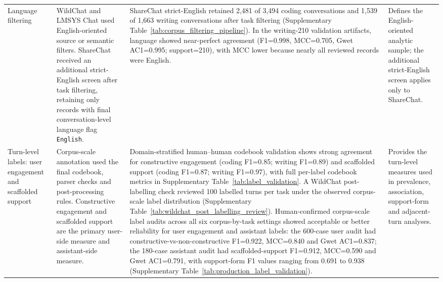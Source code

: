 \begin{table}
\begin{tabularx}{\textheight}{>{\raggedright\arraybackslash}p{0.15\textheight}>{\raggedright\arraybackslash}p{0.24\textheight}>{\raggedright\arraybackslash}p{0.25\textheight}>{\raggedright\arraybackslash}X}
\addlinespace
Language filtering & WildChat and LMSYS Chat used English-oriented source or semantic filters. ShareChat received an additional strict-English screen after task filtering, retaining only records with final conversation-level language flag \texttt{English}. & ShareChat strict-English retained 2,481 of 3,494 coding conversations and 1,539 of 1,663 writing conversations after task filtering (Supplementary Table~\ref{tab:corpus_filtering_pipeline}). In the writing-210 validation artifacts, language showed near-perfect agreement (F1=0.998, MCC=0.705, Gwet AC1=0.995; support=210), with MCC lower because nearly all reviewed records were English. & Defines the English-oriented analytic sample; the additional strict-English screen applies only to ShareChat. \\
\addlinespace
Turn-level labels: user engagement and scaffolded support & Corpus-scale annotation used the final codebook, parser checks and post-processing rules. Constructive engagement and scaffolded support are the primary user-side measure and assistant-side measure. & Domain-stratified human--human codebook validation shows strong agreement for constructive engagement (coding F1=0.85; writing F1=0.89) and scaffolded support (coding F1=0.87; writing F1=0.97), with full per-label codebook metrics in Supplementary Table~\ref{tab:label_validation}. A WildChat post-labelling check reviewed 100 labelled turns per task under the observed corpus-scale label distribution (Supplementary Table~\ref{tab:wildchat_post_labelling_review}). Human-confirmed corpus-scale label audits across all six corpus-by-task settings showed acceptable or better reliability for user engagement and assistant labels: the 600-case user audit had constructive-vs-non-constructive F1=0.922, MCC=0.840 and Gwet AC1=0.837; the 180-case assistant audit had scaffolded-support F1=0.912, MCC=0.590 and Gwet AC1=0.791, with support-form F1 values ranging from 0.691 to 0.938 (Supplementary Table~\ref{tab:production_label_validation}). & Provides the turn-level measures used in prevalence, association, support-form and adjacent-turn analyses. \\
\bottomrule
\end{tabularx}
\end{table}
